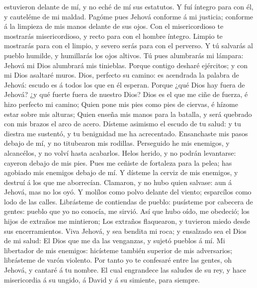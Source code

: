 estuvieron delante de mí, y no eché de mí sus estatutos. 
Y fuí íntegro para con él, y cauteléme de mi maldad. 
Pagóme pues Jehová conforme á mi justicia; conforme á la limpieza de mis
manos delante de sus ojos.  Con el misericordioso te
mostrarás misericordioso, y recto para con el hombre íntegro.
 Limpio te mostrarás para con el limpio, y severo serás
para con el perverso.  Y tú salvarás al pueblo humilde, y
humillarás los ojos altivos.  Tú pues alumbrarás mi
lámpara: Jehová mi Dios alumbrará mis tinieblas.  Porque
contigo desharé ejércitos; y con mi Dios asaltaré muros. 
Dios, perfecto su camino: es acendrada la palabra de Jehová: escudo es á
todos los que en él esperan.  Porque ¿qué Dios hay fuera
de Jehová? ¿y qué fuerte fuera de nuestro Dios?  Dios es
el que me ciñe de fuerza, é hizo perfecto mi camino; 
Quien pone mis pies como pies de ciervas, é hízome estar sobre mis
alturas;  Quien enseña mis manos para la batalla, y será
quebrado con mis brazos el arco de acero.  Dísteme
asimismo el escudo de tu salud: y tu diestra me sustentó, y tu
benignidad me ha acrecentado.  Ensanchaste mis pasos
debajo de mí, y no titubearon mis rodillas.  Perseguido
he mis enemigos, y alcancélos, y no volví hasta acabarlos.
 Helos herido, y no podrán levantarse: cayeron debajo de
mis pies.  Pues me ceñiste de fortaleza para la pelea;
has agobiado mis enemigos debajo de mí.  Y dísteme la
cerviz de mis enemigos, y destruí á los que me aborrecían.
 Clamaron, y no hubo quien salvase: aun á Jehová, mas no
los oyó.  Y molílos como polvo delante del viento;
esparcílos como lodo de las calles.  Librásteme de
contiendas de pueblo: pusísteme por cabecera de gentes: pueblo que yo no
conocía, me sirvió.  Así que hubo oído, me obedeció; los
hijos de extraños me mintieron;  Los extraños flaquearon,
y tuvieron miedo desde sus encerramientos.  Viva Jehová,
y sea bendita mi roca; y ensalzado sea el Dios de mi salud:
 El Dios que me da las venganzas, y sujetó pueblos á mí.
 Mi libertador de mis enemigos: hicísteme también
superior de mis adversarios; librásteme de varón violento.
 Por tanto yo te confesaré entre las gentes, oh Jehová, y
cantaré á tu nombre.  El cual engrandece las saludes de
su rey, y hace misericordia á su ungido, á David y á su simiente, para
siempre.

